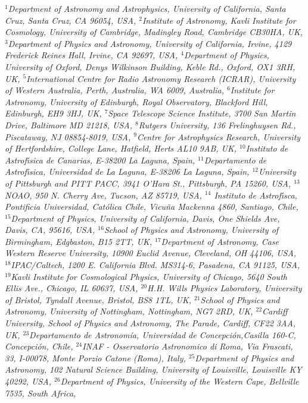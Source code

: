 {\justify\it\small
$^{1}$Department of Astronomy and Astrophysics, University of California, Santa Cruz, Santa Cruz, CA 96054, USA,
$^{2}$Institute of Astronomy, Kavli Institute for Cosmology, University of Cambridge, Madingley Road, Cambridge CB30HA, UK,
$^{3}$Department of Physics and Astronomy, University of California, Irvine, 4129 Frederick Reines Hall, Irvine, CA 92697, USA,
$^{4}$Department of Physics, University of Oxford, Denys Wilkinson Building, Keble Rd., Oxford, OX1 3RH, UK,
$^{5}$International Centre for Radio Astronomy Research (ICRAR), University of Western Australia, Perth, Australia, WA 6009, Australia,
$^{6}$Institute for Astronomy, University of Edinburgh, Royal Observatory, Blackford Hill, Edinburgh, EH9 3HJ, UK,
$^{7}$Space Telescope Science Institute, 3700 San Martin Drive, Baltimore MD 21218, USA,
$^{8}$Rutgers University, 136 Frelinghuysen Rd., Piscataway, NJ 08854-8019, USA,
$^{9}$Centre for Astrophysics Research, University of Hertfordshire, College Lane, Hatfield, Herts AL10 9AB, UK,
$^{10}$Instituto de Astrof\'\i sica de Canarias, E-38200 La Laguna, Spain,
$^{11}$Departamento de Astrof\'\i sica, Universidad de La Laguna, E-38206 La Laguna, Spain,
$^{12}$University of Pittsburgh and PITT PACC, 3941 O{'}Hara St., Pittsburgh, PA 15260, USA,
$^{13}$NOAO, 950 N. Cherry Ave, Tucson, AZ 85719, USA,
$^{14}$ Instituto de Astrof\'\i sca, Pontificia Universidad,
Cat{\'{o}}lica Chile, Vicu{\~{n}}a Mackenna 4860, Santiago, Chile,
$^{15}$Department of Physics, University of California, Davis, One Shields Ave, Davis, CA, 95616, USA,
$^{16}$School of Physics and Astronomy, University of Birmingham, Edgbaston, B15 2TT, UK,
$^{17}$Department of Astronomy, Case Western Reserve University, 10900 Euclid Avenue, Cleveland, OH 44106, USA,
$^{18}$IPAC/Caltech, 1200 E. California Blvd. MS314-6, Pasadena, CA 91125, USA,
$^{19}$Kavli Institute for Cosmological Physics, University of Chicago, 5640 South Ellis Ave., Chicago, IL 60637, USA,
$^{20}$H.H. Wills Physics Laboratory, University of Bristol, Tyndall Avenue, Bristol, BS8 1TL, UK,
$^{21}$School of Physics and Astronomy, University of Nottingham, Nottingham, NG7 2RD, UK,
$^{22}$Cardiff University, School of Physics and Astronomy, The Parade, Cardiff, CF22 3AA, UK,
$^{23}$Departamento de Astronomía, Universidad de Concepci{\'{o}}n,Casilla 160-C, Concepción, Chile,
$^{24}$INAF - Osservatorio Astronomico di Roma, Via Frascati, 33, I-00078, Monte Porzio Catone (Roma), Italy,
$^{25}$Department of Physics and Astronomy, 102 Natural Science Building, University of Louisville, Louisville KY 40292, USA,
$^{26}$Department of Physics, University of the Western Cape, Bellville 7535, South Africa,
}
